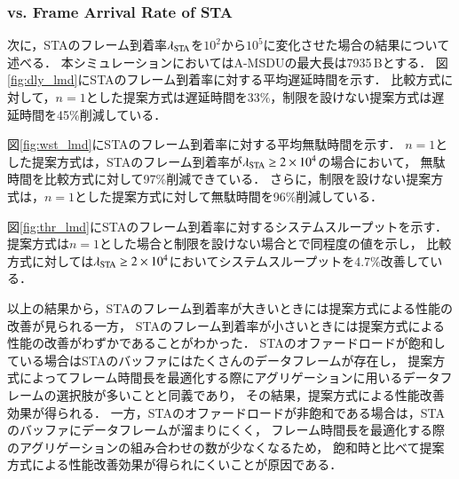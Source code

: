 \documentclass[master]{kuisthesis}		%
\begin{document}
		\subsubsection{vs. Frame Arrival Rate of STA}
			次に，STAのフレーム到着率$\lambda_{\rm STA}$を$10^2$から$10^5$に変化させた場合の結果について述べる．
			本シミュレーションにおいてはA-MSDUの最大長は7935\,Bとする．
			図\ref{fig:dly_lmd}にSTAのフレーム到着率に対する平均遅延時間を示す．
			比較方式に対して，$n=1$とした提案方式は遅延時間を33\%，制限を設けない提案方式は遅延時間を45\%削減している．
			\par
			図\ref{fig:wst_lmd}にSTAのフレーム到着率に対する平均無駄時間を示す．
			$n=1$とした提案方式は，STAのフレーム到着率が$\lambda_{\rm STA}\geq 2 \times 10^{4}$の場合において，
			無駄時間を比較方式に対して97\%削減できている．
		 	さらに，制限を設けない提案方式は，$n=1$とした提案方式に対して無駄時間を96\%削減している．
			\par
			図\ref{fig:thr_lmd}にSTAのフレーム到着率に対するシステムスループットを示す．
			提案方式は$n=1$とした場合と制限を設けない場合とで同程度の値を示し，
			比較方式に対しては$\lambda_{\rm STA} \geq 2 \times 10^{4}$においてシステムスループットを4.7\%改善している．
			\par
			以上の結果から，STAのフレーム到着率が大きいときには提案方式による性能の改善が見られる一方，
			STAのフレーム到着率が小さいときには提案方式による性能の改善がわずかであることがわかった．
			STAのオファードロードが飽和している場合はSTAのバッファにはたくさんのデータフレームが存在し，
			提案方式によってフレーム時間長を最適化する際にアグリゲーションに用いるデータフレームの選択肢が多いことと同義であり，
			その結果，提案方式による性能改善効果が得られる．
			一方，STAのオファードロードが非飽和である場合は，STAのバッファにデータフレームが溜まりにくく，
			フレーム時間長を最適化する際のアグリゲーションの組み合わせの数が少なくなるため，
			飽和時と比べて提案方式による性能改善効果が得られにくいことが原因である．
\end{document}
